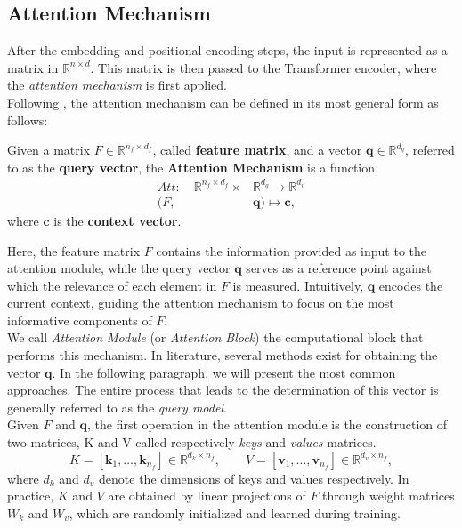 \subsection{Attention Mechanism}\label{subsec_attention}
After the embedding and positional encoding steps, the input is represented as a matrix in $\mathbb{R}^{n \times d}$. 
This matrix is then passed to the Transformer encoder, where the \textit{attention mechanism} is first applied.\\

Following \cite{Attention_survey}, the attention mechanism can be defined in its most general form as follows:
\begin{definition}\label{def_attention}
    Given a matrix $F \in \mathbb{R}^{n_f \times d_f}$, called \textbf{feature matrix}, and a vector $\mathbf{q} \in \mathbb{R}^{d_q}$, referred to as the \textbf{query vector}, the \textbf{Attention Mechanism} is a function
    \begin{equation}\label{eq_attention_function}
        \begin{aligned}
            Att:\quad \mathbb{R}^{n_f \times d_f} \times &\mathbb{R}^{d_q} \to \mathbb{R}^{d_v}\\
            (F,\quad&\mathbf{q}) \longmapsto \mathbf{c},
        \end{aligned}
    \end{equation}
    where $\mathbf{c}$ is the \textbf{context vector}.
\end{definition}

Here, the feature matrix $F$ contains the information provided as input to the attention module, while the query vector $\mathbf{q}$ serves as a reference point against which the relevance of each element in $F$ is measured. Intuitively, $\mathbf{q}$ encodes the current context, guiding the attention mechanism to focus on the most informative components of $F$.\\
We call \textit{Attention Module} (or \textit{Attention Block}) the computational block that performs this mechanism.
In literature, several methods exist for obtaining the vector $\mathbf{q}$. In the following paragraph, we will present the most common approaches. The entire process that leads to the determination of this vector is generally referred to as the \textit{query model}.\\


Given $F$ and $\mathbf{q}$, the first operation in the attention module is the construction of two matrices, K and V called respectively \textit{keys} and \textit{values} matrices.
\begin{equation}
  K = [\mathbf{k}_1,\dots,\mathbf{k}_{n_f}]  \in \mathbb{R}^{d_k \times n_f}, 
  \qquad 
  V = [\mathbf{v}_1,\dots,\mathbf{v}_{n_f}]  \in \mathbb{R}^{d_v \times n_f},
\end{equation}
where $d_k$ and $d_v$ denote the dimensions of keys and values respectively.
In practice, $K$ and $V$ are obtained by linear projections of $F$ through weight matrices $W_k$ and $W_v$, which are randomly initialized and learned during training.\\

